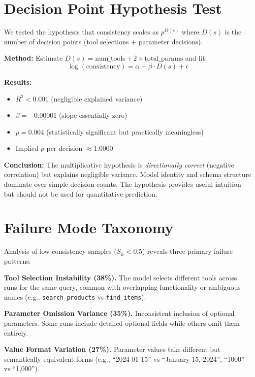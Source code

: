 \documentclass[sigconf,anonymous,review]{acmart}
\begin{document}
\section{Decision Point Hypothesis Test}
\label{app:decision_point}

We tested the hypothesis that consistency scales as $p^{D(s)}$ where $D(s)$ is the number of decision points (tool selections + parameter decisions).

\textbf{Method:} Estimate $D(s) = \text{num\_tools} + 2 \times \text{total\_params}$ and fit:
\begin{equation}
\log(\text{consistency}) = \alpha + \beta \cdot D(s) + \epsilon
\end{equation}

\textbf{Results:}
\begin{itemize}[noitemsep]
    \item $R^2 < 0.001$ (negligible explained variance)
    \item $\beta = -0.00001$ (slope essentially zero)
    \item $p = 0.004$ (statistically significant but practically meaningless)
    \item Implied $p$ per decision $\approx 1.0000$
\end{itemize}

\textbf{Conclusion:} The multiplicative hypothesis is \textit{directionally correct} (negative correlation) but explains negligible variance. Model identity and schema structure dominate over simple decision counts. The hypothesis provides useful intuition but should not be used for quantitative prediction.

\section{Failure Mode Taxonomy}
\label{app:failure_modes}

Analysis of low-consistency samples ($S_\alpha < 0.5$) reveals three primary failure patterns:

\textbf{Tool Selection Instability (38\%).} The model selects different tools across runs for the same query, common with overlapping functionality or ambiguous names (e.g., \texttt{search\_products} vs \texttt{find\_items}).

\textbf{Parameter Omission Variance (35\%).} Inconsistent inclusion of optional parameters. Some runs include detailed optional fields while others omit them entirely.

\textbf{Value Format Variation (27\%).} Parameter values take different but semantically equivalent forms (e.g., ``2024-01-15'' vs ``January 15, 2024'', ``1000'' vs ``1,000'').
\end{document}
